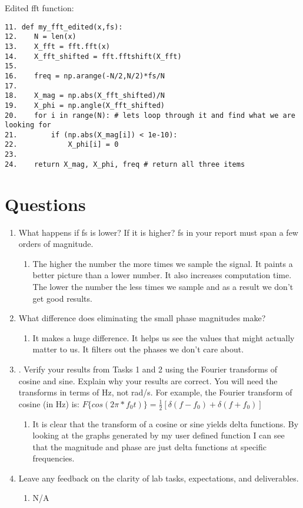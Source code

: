 \documentclass[12pt]{article}
\begin{document}
Edited fft function:
\begin{lstlisting}
11. def my_fft_edited(x,fs):
12.    N = len(x)
13.    X_fft = fft.fft(x)
14.    X_fft_shifted = fft.fftshift(X_fft)
15.    
16.    freq = np.arange(-N/2,N/2)*fs/N
17.    
18.    X_mag = np.abs(X_fft_shifted)/N
19.    X_phi = np.angle(X_fft_shifted)
20.    for i in range(N): # lets loop through it and find what we are looking for
21.        if (np.abs(X_mag[i]) < 1e-10):
22.            X_phi[i] = 0
23.            
24.    return X_mag, X_phi, freq # return all three items
\end{lstlisting}

\section{Questions}
\begin{enumerate}
    \item What happens if fs is lower? If it is higher? fs in your report must span a few orders of
magnitude.
    \begin{enumerate}
        \item The higher the number the more times we sample the signal. It paints a better picture than a lower number. It also increases computation time.
        The lower the number the less times we sample and as a result we don't get good results.
    \end{enumerate}
    \item What difference does eliminating the small phase magnitudes make?
    \begin{enumerate}
        \item It makes a huge difference. It helps us see the values that might actually matter to us. It filters out the phases we don't care about.
    \end{enumerate}
    \item . Verify your results from Tasks 1 and 2 using the Fourier transforms of cosine and sine.
Explain why your results are correct. You will need the transforms in terms of Hz, not rad/s.
For example, the Fourier transform of cosine (in Hz) is:
$F \{cos (2π*f_0t)\} = \frac{1}{2}[\delta (f − f_0) + \delta (f + f_0)]$
    \begin{enumerate}
        \item It is clear that the transform of a cosine or sine yields delta functions. By looking at the graphs generated by my user defined function I can see that the magnitude and phase are just delta functions at specific frequencies.
        
    \end{enumerate}
    \item Leave any feedback on the clarity of lab tasks, expectations, and deliverables.
    \begin{enumerate}
        \item N/A
    \end{enumerate}
\end{enumerate}
\end{document}
